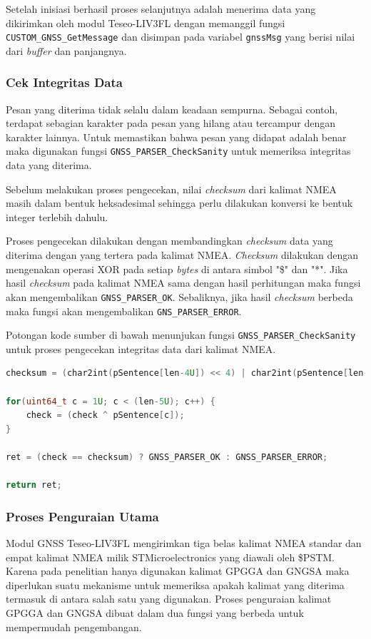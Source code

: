 Setelah inisiasi berhasil proses selanjutnya adalah menerima data yang dikirimkan oleh modul Teseo-LIV3FL dengan memanggil fungsi \texttt{CUSTOM\_GNSS\_GetMessage} dan disimpan pada variabel \texttt{gnssMsg} yang berisi nilai dari \textit{buffer} dan panjangnya.

\subsubsection{Cek Integritas Data}
Pesan yang diterima tidak selalu dalam keadaan sempurna. Sebagai contoh, terdapat sebagian karakter pada pesan yang hilang atau tercampur dengan karakter lainnya. Untuk memastikan bahwa pesan yang didapat adalah benar maka digunakan fungsi \texttt{GNSS\_PARSER\_CheckSanity} untuk memeriksa integritas data yang diterima. 

Sebelum melakukan proses pengecekan, nilai \textit{checksum} dari kalimat NMEA masih dalam bentuk heksadesimal sehingga perlu dilakukan konversi ke bentuk integer terlebih dahulu.

Proses pengecekan dilakukan dengan membandingkan \textit{checksum} data yang diterima dengan yang tertera pada kalimat NMEA. \textit{Checksum} dilakukan dengan mengenakan operasi XOR pada setiap \textit{bytes} di antara simbol "\$" dan "*". Jika hasil \textit{checksum} pada kalimat NMEA sama dengan hasil perhitungan maka fungsi akan mengembalikan \texttt{GNSS\_PARSER\_OK}. Sebaliknya, jika hasil \textit{checksum} berbeda maka fungsi akan mengembalikan \texttt{GNS\_PARSER\_ERROR}.

Potongan kode sumber di bawah menunjukan fungsi \texttt{GNSS\_PARSER\_CheckSanity} untuk proses pengecekan integritas data dari kalimat NMEA.
\begin{lstlisting}[language=c]
checksum = (char2int(pSentence[len-4U]) << 4) | char2int(pSentence[len-3U]);
		
for(uint64_t c = 1U; c < (len-5U); c++) {
	check = (check ^ pSentence[c]);
}
		
ret = (check == checksum) ? GNSS_PARSER_OK : GNSS_PARSER_ERROR;
	
return ret;
\end{lstlisting}

\subsubsection{Proses Penguraian Utama}
Modul GNSS Teseo-LIV3FL mengirimkan tiga belas kalimat NMEA standar dan empat kalimat NMEA milik STMicroelectronics yang diawali oleh \$PSTM. Karena pada penelitian hanya digunakan kalimat GPGGA dan GNGSA maka diperlukan suatu mekanisme untuk memeriksa apakah kalimat yang diterima termasuk di antara salah satu yang digunakan. Proses penguraian kalimat GPGGA dan GNGSA dibuat dalam dua fungsi yang berbeda untuk mempermudah pengembangan. 

